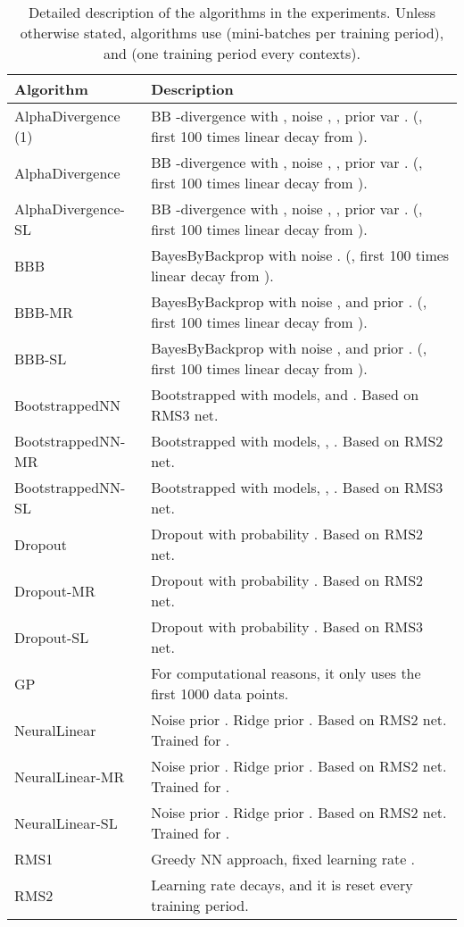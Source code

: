 \documentclass{article} \usepackage{iclr2018_conference,times}
\begin{document}
\begin{table}[ht]
  \caption{Detailed description of the algorithms in the experiments. Unless otherwise stated, algorithms use  (mini-batches per training period), and  (one training period every  contexts).}
  \label{tab:algo_description_main}
  \centering
  \footnotesize
  \tiny
\begin{adjustbox}{center}
  \begin{tabular}{ll}
  Algorithm  & Description \\
    \midrule
AlphaDivergence (1) & BB -divergence with , noise , , prior var . (, first 100 times linear decay from ).  \\
AlphaDivergence & BB -divergence with , noise , , prior var . (, first 100 times linear decay from ). \\
AlphaDivergence-SL & BB -divergence with , noise , , prior var . (, first 100 times linear decay from ).  \\
BBB & BayesByBackprop with noise . (, first 100 times linear decay from ). \\
BBB-MR & BayesByBackprop with noise , and prior . (, first 100 times linear decay from ). \\
BBB-SL & BayesByBackprop with noise , and prior . (, first 100 times linear decay from ). \\
BootstrappedNN & Bootstrapped with  models, and . Based on RMS3 net. \\
BootstrappedNN-MR & Bootstrapped with  models, , . Based on RMS2 net. \\
BootstrappedNN-SL & Bootstrapped with  models, , . Based on RMS3 net. \\
Dropout & Dropout with probability . Based on RMS2 net. \\
Dropout-MR & Dropout with probability . Based on RMS2 net. \\
Dropout-SL & Dropout with probability . Based on RMS3 net. \\
GP & For computational reasons, it only uses the first 1000 data points. \\
NeuralLinear & Noise prior . Ridge prior . Based on RMS2 net. Trained for .  \\
NeuralLinear-MR & Noise prior . Ridge prior . Based on RMS2 net. Trained for .  \\
NeuralLinear-SL & Noise prior . Ridge prior . Based on RMS2 net. Trained for .  \\
RMS1 & Greedy NN approach, fixed learning rate . \\
RMS2 & Learning rate decays, and it is reset every training period. \\

\end{tabular}
\end{adjustbox}
\end{table}
\end{document}
